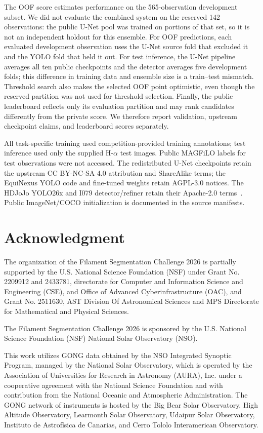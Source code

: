 \documentclass[sigconf]{acmart}
\begin{document}
The OOF score estimates performance on the 565-observation development subset. We did not evaluate the combined system on the reserved 142 observations: the public U-Net pool was trained on portions of that set, so it is not an independent holdout for this ensemble. For OOF predictions, each evaluated development observation uses the U-Net source fold that excluded it and the YOLO fold that held it out. For test inference, the U-Net pipeline averages all ten public checkpoints and the detector averages five development folds; this difference in training data and ensemble size is a train--test mismatch. Threshold search also makes the selected OOF point optimistic, even though the reserved partition was not used for threshold selection. Finally, the public leaderboard reflects only its evaluation partition and may rank candidates differently from the private score. We therefore report validation, upstream checkpoint claims, and leaderboard scores separately.

All task-specific training used competition-provided training annotations; test inference used only the supplied H-$\alpha$ test images. Public MAGFiLO labels for test observations were not accessed. The redistributed U-Net checkpoints retain the upstream CC BY-NC-SA 4.0 attribution and ShareAlike terms; the EquiNexus YOLO code and fine-tuned weights retain AGPL-3.0 notices. The HDJoJo YOLO26x and I079 detector/refiner retain their Apache-2.0 terms~\cite{afshar2026,ultralytics2026,hdjojo2026,i0792026}. Public ImageNet/COCO initialization is documented in the source manifests.



\section{Acknowledgment}\label{sec:acknowledgment}
    The organization of the Filament Segmentation Challenge 2026 is partially supported by the U.S. National Science Foundation (NSF) under Grant No. 2209912 and 2433781, directorate for Computer and Information Science and Engineering (CSE), and Office of Advanced Cyberinfrastructure (OAC), and Grant No. 2511630, AST Division Of Astronomical Sciences and MPS Directorate for Mathematical and Physical Sciences.

    The Filament Segmentation Challenge 2026 is sponsored by the U.S. National Science Foundation (NSF) National Solar Observatory (NSO).

    This work utilizes GONG data obtained by the NSO Integrated Synoptic Program, managed by the National Solar Observatory, which is operated by the Association of Universities for Research in Astronomy (AURA), Inc. under a cooperative agreement with the National Science Foundation and with contribution from the National Oceanic and Atmospheric Administration. The GONG network of instruments is hosted by the Big Bear Solar Observatory, High Altitude Observatory, Learmonth Solar Observatory, Udaipur Solar Observatory, Instituto de Astrofísica de Canarias, and Cerro Tololo Interamerican Observatory.



\end{document}
